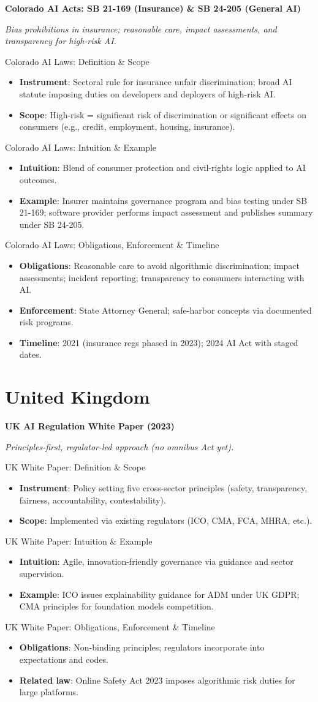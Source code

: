 \documentclass[aspectratio=169]{beamer}
\newcommand{\RegTitle}[2]{%
  \begin{frame}[plain]
    \centering
    \vfill
    {\usebeamerfont{title}\usebeamercolor[fg]{title}\LARGE \textbf{#1}\par}
    \vspace{0.4em}
    {\small \itshape #2\par}
    \vfill
  \end{frame}
}
\newcommand{\RegDef}[2]{%
  \begin{frame}{#1: Definition \& Scope}
    \begin{itemize}
      #2
    \end{itemize}
  \end{frame}
}
\newcommand{\RegIntuition}[2]{%
  \begin{frame}{#1: Intuition \& Example}
    \begin{itemize}
      #2
    \end{itemize}
  \end{frame}
}
\newcommand{\RegCompliance}[2]{%
  \begin{frame}{#1: Obligations, Enforcement \& Timeline}
    \begin{itemize}
      #2
    \end{itemize}
  \end{frame}
}
\begin{document}
\RegTitle{Colorado AI Acts: SB 21-169 (Insurance) \& SB 24-205 (General AI)}{Bias prohibitions in insurance; reasonable care, impact assessments, and transparency for high-risk AI.}
\RegDef{Colorado AI Laws}{%
  \item \textbf{Instrument}: Sectoral rule for insurance unfair discrimination; broad AI statute imposing duties on developers and deployers of high-risk AI.
  \item \textbf{Scope}: High-risk = significant risk of discrimination or significant effects on consumers (e.g., credit, employment, housing, insurance).
}
\RegIntuition{Colorado AI Laws}{%
  \item \textbf{Intuition}: Blend of consumer protection and civil-rights logic applied to AI outcomes.
  \item \textbf{Example}: Insurer maintains governance program and bias testing under SB 21-169; software provider performs impact assessment and publishes summary under SB 24-205.
}
\RegCompliance{Colorado AI Laws}{%
  \item \textbf{Obligations}: Reasonable care to avoid algorithmic discrimination; impact assessments; incident reporting; transparency to consumers interacting with AI.
  \item \textbf{Enforcement}: State Attorney General; safe-harbor concepts via documented risk programs.
  \item \textbf{Timeline}: 2021 (insurance regs phased in 2023); 2024 AI Act with staged dates.
}

\section{United Kingdom}

\RegTitle{UK AI Regulation White Paper (2023)}{Principles-first, regulator-led approach (no omnibus Act yet).}
\RegDef{UK White Paper}{%
  \item \textbf{Instrument}: Policy setting five cross-sector principles (safety, transparency, fairness, accountability, contestability).
  \item \textbf{Scope}: Implemented via existing regulators (ICO, CMA, FCA, MHRA, etc.).
}
\RegIntuition{UK White Paper}{%
  \item \textbf{Intuition}: Agile, innovation-friendly governance via guidance and sector supervision.
  \item \textbf{Example}: ICO issues explainability guidance for ADM under UK GDPR; CMA principles for foundation models competition.
}
\RegCompliance{UK White Paper}{%
  \item \textbf{Obligations}: Non-binding principles; regulators incorporate into expectations and codes.
  \item \textbf{Related law}: Online Safety Act 2023 imposes algorithmic risk duties for large platforms.
}
\end{document}
